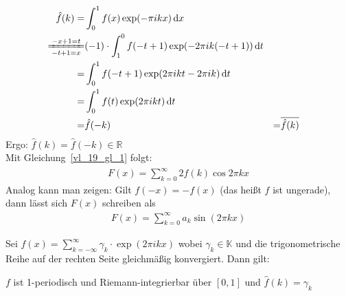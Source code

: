 \begin{Bemerkung}
{\begin{itemize}
		\begin{align*}
			\hat{f}(k) = & \int_0^1 f(x) \exp(-\pi ikx) \dd{x} \\
			 \xlongequal[-t+1=x]{-x+1 = t} &(-1) \cdot \int_1^0 f(-t+1) 
			 	\exp(-2\pi ik (-t+1)) \dd{t} \\
			 = & \int_0^1 f(-t+1)\exp(2\pi i k t - 2\pi ik)  \dd{t} \\
			 = & \int_0^1 f(t) \exp(2\pi ikt) \dd{t} \\
			 = & \hat{f}(-k) &= & \overline{\hat{f}(k)}
		\end{align*}
		Ergo: $\hat{f}(k) = \hat{f}(-k) \in \mathbb{R}$ \\
		Mit Gleichung~\ref{vl_19_gl_1} folgt:
		\begin{align*}
			 F(x) = \sum_{k=0}^{\infty}  2 \hat{f}(k) \cos 2 \pi k x
		\end{align*}
		Analog kann man zeigen: Gilt $f(-x) = - f(x)$ 
		(das heißt $f$ ist ungerade), 
		dann lässt sich $F(x)$ schreiben als
		\begin{align*}
			F(x) = \sum_{k=0}^{\infty}a_k \sin(2\pi k x)
		\end{align*}		 
	\end{itemize}
}\end{Bemerkung}

\begin{Proposition}{%
	Sei $f(x) = \sum_{k = -\infty}^{\infty} \gamma_k \cdot \exp(2\pi i k x)$ wobei 
	$\gamma_k \in \mathbb{K}$ und die trigonometrische Reihe auf der rechten Seite 
	gleichmäßig konvergiert. Dann gilt:
	\begin{center}
		$f$ ist 1-periodisch und Riemann-integrierbar über $[0,1]$ und 
		$\hat{f}(k) = \gamma_k$
	\end{center}
}\end{Proposition}

